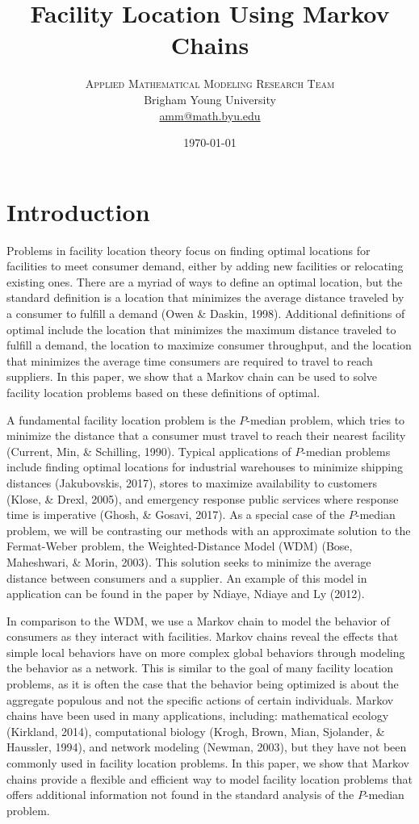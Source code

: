 \documentclass[twoside,twocolumn]{article}
\title{Facility Location Using Markov Chains}
\author{
\textsc{Applied Mathematical Modeling Research Team}\\[1ex]
\normalsize Brigham Young University \\
\normalsize \href{mailto:amm@math.byu.edu}{amm@math.byu.edu}
}
\date{\today}
\begin{document}
\maketitle

\section{Introduction}

Problems in facility location theory focus on finding optimal locations for facilities to meet consumer demand, either by adding new facilities or relocating existing ones.
There are a myriad of ways to define an optimal location, but the standard definition is a location that minimizes the average distance traveled by a consumer to fulfill a demand (Owen \& Daskin, 1998).
Additional definitions of optimal include the location that minimizes the maximum distance traveled to fulfill a demand, the location to maximize consumer throughput, and the location that minimizes the average time consumers are required to travel to reach suppliers.
In this paper, we show that a Markov chain can be used to solve facility location problems based on these definitions of optimal.

A fundamental facility location problem is the $P$-median problem, which tries to minimize the distance that a consumer must travel to reach their nearest facility (Current, Min, \& Schilling, 1990).
Typical applications of $P$-median problems include finding optimal locations for industrial warehouses to minimize shipping distances (Jakubovskis, 2017), stores to maximize availability to customers (Klose, \& Drexl, 2005), and emergency response public services where response time is imperative (Ghosh, \& Gosavi, 2017).
As a special case of the $P$-median problem, we will be contrasting our methods with an approximate solution to the Fermat-Weber problem, the Weighted-Distance Model (WDM) (Bose, Maheshwari, \& Morin, 2003).
This solution seeks to minimize the average distance between consumers and a supplier.
An example of this model in application can be found in the paper by Ndiaye, Ndiaye and Ly (2012).

In comparison to the WDM, we use a Markov chain to model the behavior of consumers as they interact with facilities. 
Markov chains reveal the effects that simple local behaviors have on more complex global behaviors through modeling the behavior as a network.
This is similar to the goal of many facility location problems, as it is often the case that the behavior being optimized is about the aggregate populous and not the specific actions of certain individuals.
Markov chains have been used in many applications, including: mathematical ecology (Kirkland, 2014), computational biology (Krogh, Brown, Mian, Sjolander, \& Haussler, 1994), and network modeling (Newman, 2003), but they have not been commonly used in facility location problems.
In this paper, we show that Markov chains provide a flexible and efficient way to model facility location problems that offers additional information not found in the standard analysis of the $P$-median problem.
\end{document}
